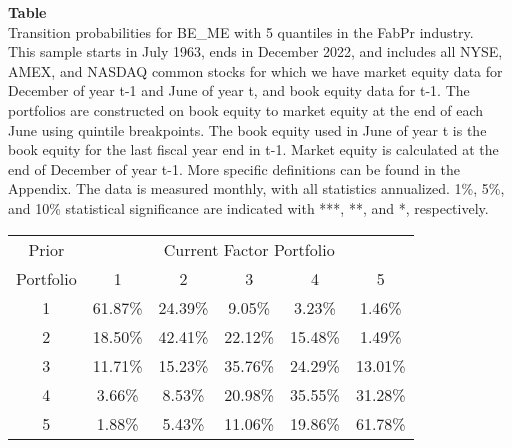 \begin{table*}[ht!]
\raggedright
{}
\label{tab: transition_probs_BE_ME_FabPr_with_5_quantiles}
\textbf{Table \thetable} \\
Transition probabilities for BE_ME with 5 quantiles in the FabPr industry. \\
\hspace*{1em}This sample starts in July 1963, ends in December 2022, and includes all NYSE, AMEX, and NASDAQ common stocks for which we have market equity data for December of year t-1 and June of year t, and book equity data for t-1. The portfolios are constructed on book equity to market equity at the end of each June using quintile breakpoints.  The book equity used in June of year t is the book equity for the last fiscal year end in t-1.  Market equity is calculated at the end of December of year t-1.  More specific definitions can be found in the Appendix.  The data is measured monthly, with all statistics annualized.  1\%, 5\%, and 10\% statistical significance are indicated with ***, **, and *, respectively. \\
\vspace{0.5em}
\centering
\begin{adjustbox}{max width=\textwidth}
\begin{tabular}{@{}cccccc@{}}
\toprule
Prior & \multicolumn{5}{c}{Current Factor Portfolio} \\
Portfolio & 1 & 2 & 3 & 4 & 5 \\
\midrule
1 & 61.87\% & 24.39\% & 9.05\% & 3.23\% & 1.46\% \\
2 & 18.50\% & 42.41\% & 22.12\% & 15.48\% & 1.49\% \\
3 & 11.71\% & 15.23\% & 35.76\% & 24.29\% & 13.01\% \\
4 & 3.66\% & 8.53\% & 20.98\% & 35.55\% & 31.28\% \\
5 & 1.88\% & 5.43\% & 11.06\% & 19.86\% & 61.78\% \\
\bottomrule
\end{tabular}
\end{adjustbox}
\end{table*}